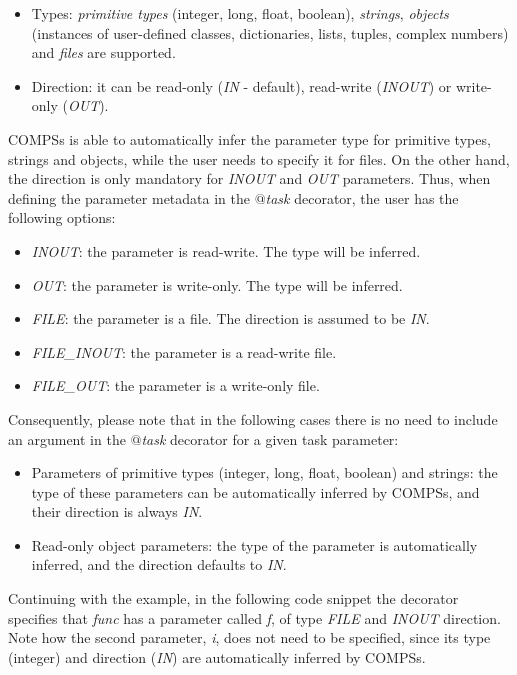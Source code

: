 \begin{itemize}
 \item Types: {\it primitive types} (integer, long, float, boolean), {\it strings}, {\it objects} (instances of user-defined classes, dictionaries, lists, tuples, complex numbers) and {\it files} are supported.
 \item Direction: it can be read-only ({\it IN} - default), read-write ({\it INOUT}) or write-only ({\it OUT}).
\end{itemize}

COMPSs is able to automatically infer the parameter type for primitive types, strings and objects, 
while the user needs to specify it for files. On the other hand, the direction is only mandatory for 
{\it INOUT} and {\it OUT} parameters. Thus, when defining the parameter metadata in the {\it $@$task} 
decorator, the user has the following options:

\begin{itemize}
 \item {\it INOUT}: the parameter is read-write. The type will be inferred.
 \item {\it OUT}: the parameter is write-only. The type will be inferred.
 \item {\it FILE}: the parameter is a file. The direction is assumed to be {\it IN}.
 \item {\it FILE\_INOUT}: the parameter is a read-write file.
 \item {\it FILE\_OUT}: the parameter is a write-only file.
\end{itemize}
     
Consequently, please note that in the following cases there is no need to include an argument in 
the {\it $@$task} decorator for a given task parameter:

\begin{itemize}
 \item Parameters of primitive types (integer, long, float, boolean) and strings: the type of these 
       parameters can be automatically inferred by COMPSs, and their direction is always {\it IN}.
 \item Read-only object parameters: the type of the parameter is automatically inferred, and the 
       direction defaults to {\it IN}.
\end{itemize}
 
Continuing with the example, in the following code snippet the decorator specifies that {\it func} 
has a parameter called {\it f}, of type {\it FILE} and {\it INOUT} direction. Note how the second 
parameter, {\it i}, does not need to be specified, since its type (integer) and direction ({\it IN}) 
are automatically inferred by COMPSs.

